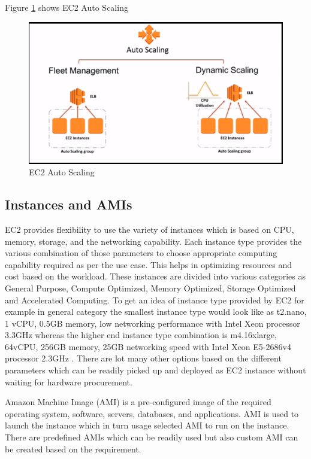 Figure \ref{f:ec2-auto-scaling} shows EC2 Auto Scaling
\begin{figure}[!ht]
  \centering\includegraphics[width=\columnwidth]{images/ec2AutoScaling.PNG}
  \caption{EC2 Auto Scaling \cite{www-aws-ec2autoscaling}}\label{f:ec2-auto-scaling}
\end{figure}

\subsection{Instances and AMIs}
EC2 provides flexibility to use the variety of instances which is based on CPU, memory, storage, and the networking capability. Each instance type provides the various combination of those parameters to choose appropriate computing capability required as per the use case. This helps in optimizing resources and cost based on the workload. These instances are divided into various categories as General Purpose, Compute Optimized, Memory Optimized, Storage Optimized and Accelerated Computing. To get an idea of instance type provided by EC2 for example in general category the smallest instance type would look like as t2.nano, 1 vCPU, 0.5GB memory, low networking performance with Intel Xeon processor 3.3GHz whereas the higher end instance type combination is m4.16xlarge, 64vCPU, 256GB memory, 25GB networking speed with Intel Xeon E5-2686v4 processor 2.3GHz \cite{www-aws-ec2instance}. There are lot many other options based on the different parameters which can be readily picked up and deployed as EC2 instance without waiting for hardware procurement.

Amazon Machine Image (AMI) \cite{www-aws-ec2instance} is a pre-configured image of the required operating system, software, servers, databases, and applications. AMI is used to launch the instance which in turn usage selected AMI to run on the instance. There are predefined AMIs which can be readily used but also custom AMI can be created based on the requirement.

